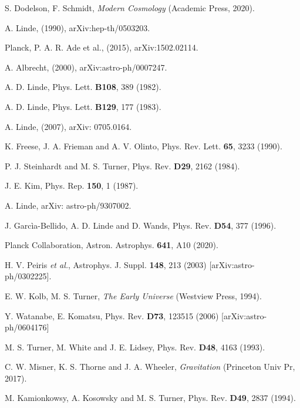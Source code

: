 \documentclass[11pt,a4paper,twoside]{book}
\begin{document}
\begin{thebibliography}{2}
	 S. Dodelson, F. Schmidt, \emph{Modern Cosmology} (Academic Press, 2020).
	
	 A. Linde,  (1990), arXiv:hep-th/0503203.
	
	 Planck, P. A. R. Ade et al., (2015), arXiv:1502.02114.
	
	 A. Albrecht, (2000), arXiv:astro-ph/0007247.
	
	 A. D. Linde, Phys. Lett. \textbf{B108}, 389 (1982).
	
	 A. D. Linde, Phys. Lett. \textbf{B129}, 177  (1983).  
	
	 A. Linde, (2007), arXiv: 0705.0164. 
	
	 K. Freese, J. A. Frieman and A. V. Olinto, Phys. Rev. Lett. \textbf{65}, 3233 (1990).
	
	 P. J. Steinhardt and M. S. Turner, Phys. Rev. \textbf{D29}, 2162 (1984).
	
	 J. E. Kim, Phys. Rep. \textbf{150}, 1 (1987).
	
	 A. Linde, arXiv: astro-ph/9307002.
	
	 J. Garcìa-Bellido, A. D. Linde and D. Wands, Phys. Rev. \textbf{D54}, 377 (1996).
	
	 Planck Collaboration, Astron. Astrophys. \textbf{641}, A10 (2020).
	
	 H. V. Peiris \textit{et al.}, Astrophys. J. Suppl. \textbf{148}, 213 (2003) [arXiv:astro-ph/0302225].
	
	 E. W. Kolb, M. S. Turner, \textit{The Early Universe} (Westview Press, 1994).
	
	 Y. Watanabe, E. Komatsu, Phys. Rev. \textbf{D73}, 123515 (2006) [arXiv:astro-ph/0604176]
	
	 M. S. Turner, M. White and J. E. Lidsey, Phys. Rev. \textbf{D48}, 4163 (1993).
	
	 C. W. Misner, K. S. Thorne and J. A. Wheeler, \textit{Gravitation} (Princeton Univ Pr, 2017).
	
	 M. Kamionkowsy, A. Kosowsky and M. S. Turner, Phys. Rev. \textbf{D49}, 2837 (1994).
	

\end{thebibliography}
\end{document}
